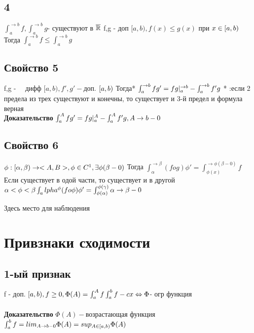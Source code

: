 ﻿\documentclass[12pt, a4paper]{article}
\begin{document}
    \subsection{4}
    $  \int_a^{\rightarrow b} f,  \int_a^{\rightarrow b} g $- существуют в $ \overline{\mathbb{R}} \\$
    f,g - доп $ [a, b), f(x) \leq  g(x) $ при  $ x \in [a,b) \\$
    Тогда $  \int_a^{\rightarrow b} f \leq  \int_a^{\rightarrow b} g  $
    \subsection{Свойство 5}
    f,g -   дифф $ [a, b), f' , g' - $доп. $ [a,b) \\$
    Тогда* $  \int_a^{\rightarrow b} f g' = f g |_a^{\rightarrow b} - \int_a^{\rightarrow b} f' g \\$
    * :если  2 предела  из трех существуют и конечны, то существует и 3-й предел  и формула верная \\
    \textbf{Доказательство}
    $  \int_a^A f g' = f g |_a^A - \int_a^A f' g , A \rightarrow b -0 \\ $
       \subsection{Свойство 6}
       $ \phi : [\alpha, \beta) \rightarrow <A,B >, \phi \in C^1,  \exists \phi (\beta - 0) \\$
       Тогда $  \int_\alpha^{\rightarrow \beta} (f o g)\phi' = \int_{\phi(x)}^{\rightarrow\phi(\beta - 0)}  f$ 	Если существует в одой части, то существует и в другой\\
       $ \alpha < \phi <  \beta \\
       \int_alpha^\phi (f o \phi) \phi' = \int_{\phi(\alpha)}^{\phi(\gamma)}\\
       \alpha \rightarrow  \beta -0 \\$
       
       Здесь место для наблюдения  \\
      \section{Привзнаки сходимости}
      \subsection{1-ый признак}
      f - доп. $ [a,b), f\geq 0, \Phi(A) =\int_a^A f\\
      \int_a^b f -cx \Leftrightarrow \Phi $- огр функция\\
      \\
      \textbf{Доказательство}
      $ \Phi(A)- $возрастающая функция \\
       $ \int_a^b f = lim_{A \rightarrow b - 0} \Phi(A)= sup_{A \in [a,b)} \Phi (A)\\$
\end{document}
